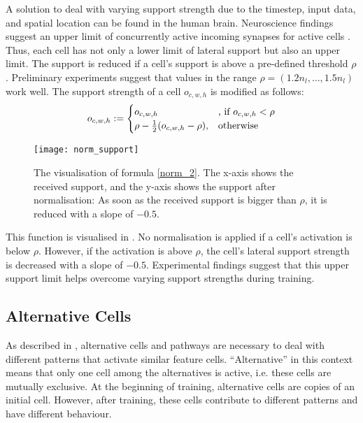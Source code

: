 A solution to deal with varying support strength due to the timestep, input data, and spatial location can be found in the human brain.
Neuroscience findings suggest an upper limit of concurrently active incoming synapses for active cells . Thus, each cell has not only a lower limit of lateral support but also an upper limit.
The support is reduced if a cell's support is above a pre-defined threshold $\rho$.
Preliminary experiments suggest that values in the range $\rho = (1.2n_l, ..., 1.5n_l)$ work well.
The support strength of a cell $o_{c,w,h}$ is modified as follows:
%
\begin{align}\eqlbl{norm_2}
	o_{c,w,h} := \begin{cases}
      		o_{c,w,h} & \text{, if } o_{c,w,h} < \rho \\
      		\rho - \frac{1}{2}(o_{c,w,h} - \rho), & \text{otherwise}
    	\end{cases}
\end{align}
%
\begin{figure}[h]
    \centering
    \texttt{[image: norm\_support]}
    \caption[Inhibition for too many activated cells]{The visualisation of formula \eqref{norm_2}. The x-axis shows the received support, and the y-axis shows the support after normalisation: As soon as the received support is bigger than $\rho$, it is reduced with a slope of $-0.5$.}
\end{figure}
This function is visualised in . No normalisation is applied if a cell's activation is below $\rho$. However, if the activation is above $\rho$, the cell's lateral support strength is decreased with a slope of $-0.5$. Experimental findings suggest that this upper support limit helps overcome varying support strengths during training.



\subsection{Alternative Cells}
As described in , alternative cells and pathways are necessary to deal with different patterns that activate similar feature cells.
``Alternative'' in this context means that only one cell among the alternatives is active, i.e. these cells are mutually exclusive.
At the beginning of training, alternative cells are copies of an initial cell.
However, after training, these cells contribute to different patterns and have different behaviour.

